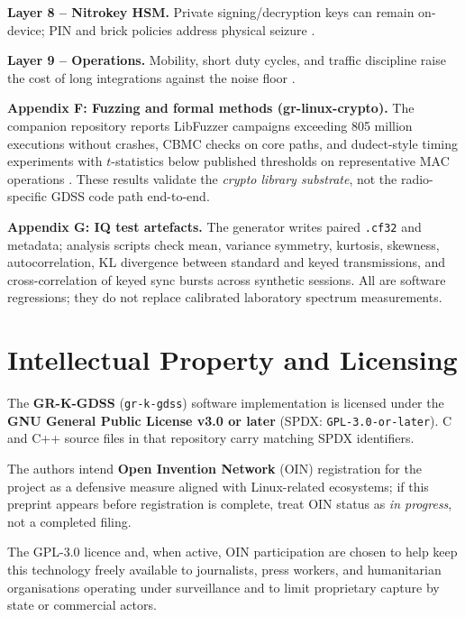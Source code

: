 \documentclass[10pt,a4paper,twocolumn]{article}
\begin{document}
\noindent\textbf{Layer 8 -- Nitrokey HSM.} Private signing/decryption keys can remain on-device; PIN and brick policies address physical seizure \cite{repo_gdss}.

\noindent\textbf{Layer 9 -- Operations.} Mobility, short duty cycles, and traffic discipline raise the cost of long integrations against the noise floor \cite{repo_gdss}.

\vspace{0.5em}
\noindent\textbf{Appendix F: Fuzzing and formal methods (gr-linux-crypto).} The companion repository reports LibFuzzer campaigns exceeding 805 million executions without crashes, CBMC checks on core paths, and dudect-style timing experiments with $t$-statistics below published thresholds on representative MAC operations \cite{repo_crypto_results,reparaz2017}. These results validate the \emph{crypto library substrate}, not the radio-specific GDSS code path end-to-end.

\vspace{0.5em}
\noindent\textbf{Appendix G: IQ test artefacts.} The generator writes paired \texttt{.cf32} and metadata; analysis scripts check mean, variance symmetry, kurtosis, skewness, autocorrelation, KL divergence between standard and keyed transmissions, and cross-correlation of keyed sync bursts across synthetic sessions. All are software regressions; they do not replace calibrated laboratory spectrum measurements.

\section{Intellectual Property and Licensing}
The \textbf{GR-K-GDSS} (\texttt{gr-k-gdss}) software implementation is licensed under the \textbf{GNU General Public License v3.0 or later} (SPDX: \texttt{GPL-3.0-or-later}). C and C++ source files in that repository carry matching SPDX identifiers.

The authors intend \textbf{Open Invention Network} (OIN) registration for the project as a defensive measure aligned with Linux-related ecosystems; if this preprint appears before registration is complete, treat OIN status as \emph{in progress}, not a completed filing.

The GPL-3.0 licence and, when active, OIN participation are chosen to help keep this technology freely available to journalists, press workers, and humanitarian organisations operating under surveillance and to limit proprietary capture by state or commercial actors.
\end{document}
